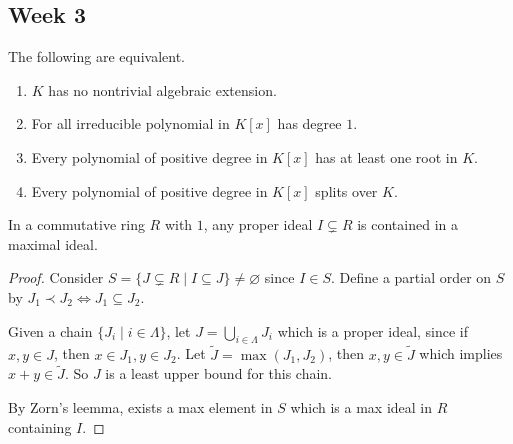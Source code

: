 \subsection{Week 3}

\begin{prop}
  The following are equivalent.
  \begin{enumerate}
    \item $K$ has no nontrivial algebraic extension.
    \item For all irreducible polynomial in $K[x]$ has degree $1$.
    \item Every polynomial of  positive degree in $K[x]$ has at least one root in $K$.
    \item Every polynomial of  positive degree in $K[x]$ splits over $K$.
  \end{enumerate}
\end{prop}

\begin{lemma} \label{lemma:max-ideal-exists}
  In a commutative ring $R$ with $1$, any proper ideal $I \subsetneq R$ is contained in a maximal ideal.

  \begin{proof}
    Consider $S = \{ J \subsetneq R \mid I \subseteq J \} \neq \varnothing$ since $I \in S$.
    Define a partial order on $S$ by $J_1 \prec J_2 \iff J_1 \subseteq J_2$.

    Given a chain $\{ J_i \mid i \in \Lambda \}$, let $J = \bigcup_{i \in \Lambda} J_i$ which is a proper
    ideal, since if $x, y \in J$, then $x \in J_1, y \in J_2$. Let $\tilde{J} = \max(J_1, J_2)$, then $x, y \in \tilde{J}$
    which implies $x + y \in \tilde{J}$. So $J$ is a least upper bound for this chain.

    By Zorn's leemma, exists a max element in $S$ which is a max ideal in $R$ containing $I$.
  \end{proof}
\end{lemma}

